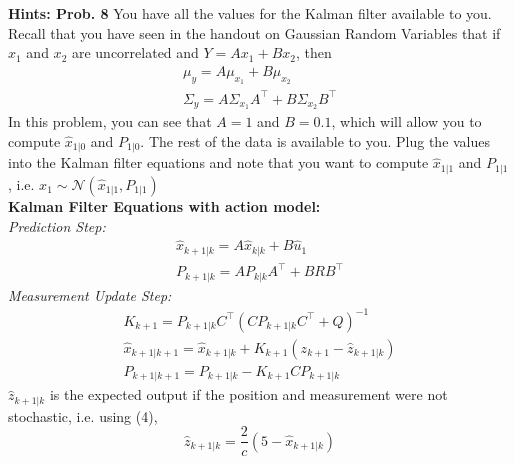\documentclass[letterpaper]{article}
\begin{document}
\vspace{1cm}

\noindent \textbf{Hints: Prob. 8 } You have all the values for the Kalman filter available to you. Recall that you have seen in the handout on Gaussian Random Variables that if $x_1$ and $x_2$ are uncorrelated and $Y=Ax_1 + Bx_2$, then
\begin{align}
	\mu_y= A \mu_{x_1} + B \mu_{x_2} \nonumber \\
	\Sigma_y = A \Sigma_{x_1} A^\top + B \Sigma_{x_2} B^\top \nonumber
\end{align}
In this problem, you can see that $A=1$ and $B=0.1$, which will allow you to compute $\hat x_{1|0}$ and $P_{1|0}$. The rest of the data is available to you. Plug the values into the Kalman filter equations and note that you want to compute $\hat x_{1|1}$ and $P_{1|1}$, i.e. $x_1 \sim \mathcal{N} (\hat x_{1|1},P_{1|1})$\\

\textbf{Kalman Filter Equations with action model:}\\
\textit{Prediction Step:}
\begin{align}
	\hat x_{k+1|k}= A \hat x_{k|k} + B \hat u_{1} \nonumber \\
	P_{k+1|k} = A P_{k|k}  A^\top + B R  B^\top \nonumber
\end{align}
\textit{Measurement Update Step:}
\begin{align}
	K_{k+1} = P_{k+1|k} C^\top(C P_{k+1|k} C^\top + Q)^{-1} \nonumber \\
	\hat x_{k+1|k+1}= \hat x_{k+1|k} + K_{k+1}(z_{k+1} - \hat z_{k+1|k}) \nonumber \\
	P_{k+1|k+1} = P_{k+1|k} -  K_{k+1} C P_{k+1|k} \nonumber
\end{align}
$\hat z_{k+1|k}$ is the expected output if the position and measurement were not stochastic, i.e. using (4),   $$\hat z_{k+1|k} = \frac{2}{c}(5-\hat x_{k+1|k})$$
\end{document}
